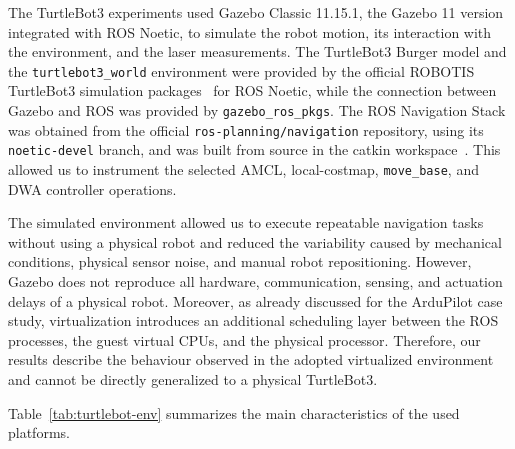 \noindent The TurtleBot3 experiments used Gazebo Classic 11.15.1, the Gazebo 11 version integrated with ROS Noetic, to simulate the robot motion, its interaction with the environment, and the laser measurements. The TurtleBot3 Burger model and the \texttt{turtlebot3\_world} environment were provided by the official ROBOTIS TurtleBot3 simulation packages~\cite{turtle_simulation} for ROS Noetic, while the connection between Gazebo and ROS was provided by \texttt{gazebo\_ros\_pkgs}. The ROS Navigation Stack was obtained from the official \texttt{ros-planning/navigation} repository, using its \texttt{noetic-devel} branch, and was built from source in the catkin workspace~\cite{ros-planning}. This allowed us to instrument the selected AMCL, local-costmap, \texttt{move\_base}, and DWA controller operations.

\noindent The simulated environment allowed us to execute repeatable navigation tasks without using a physical robot and reduced the variability caused by mechanical conditions, physical sensor noise, and manual robot repositioning. However, Gazebo does not reproduce all hardware, communication, sensing, and actuation delays of a physical robot. Moreover, as already discussed for the ArduPilot case study, virtualization introduces an additional scheduling layer between the ROS processes, the guest virtual CPUs, and the physical processor. Therefore, our results describe the behaviour observed in the adopted virtualized environment and cannot be directly generalized to a physical TurtleBot3.

\noindent Table~\ref{tab:turtlebot-env} summarizes the main characteristics of the used platforms.

